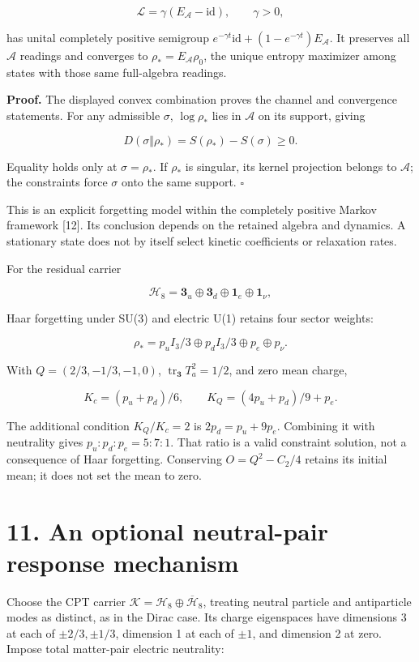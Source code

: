 \documentclass[
  11pt,
  a4paper,
]{article}
\begin{document}
\[
 \mathcal L=\gamma(E_{\mathcal A}-\mathrm{id}),\qquad\gamma>0,
\]

has unital completely positive semigroup \(e^{-\gamma t}\mathrm{id}+(1-e^{-\gamma t})E_{\mathcal A}\). It preserves all \(\mathcal A\) readings and converges to \(\rho_*=E_{\mathcal A}\rho_0\), the unique entropy maximizer among states with those same full-algebra readings.

\textbf{Proof.} The displayed convex combination proves the channel and convergence statements. For any admissible \(\sigma\), \(\log\rho_*\) lies in \(\mathcal A\) on its support, giving

\[
 D(\sigma\Vert\rho_*)=S(\rho_*)-S(\sigma)\ge0.
\]

Equality holds only at \(\sigma=\rho_*\). If \(\rho_*\) is singular, its kernel projection belongs to \(\mathcal A\); the constraints force \(\sigma\) onto the same support. \(\square\)

This is an explicit forgetting model within the completely positive Markov framework {[}12{]}. Its conclusion depends on the retained algebra and dynamics. A stationary state does not by itself select kinetic coefficients or relaxation rates.

For the residual carrier

\[
 \mathcal H_8=\mathbf3_u\oplus\mathbf3_d\oplus\mathbf1_e\oplus\mathbf1_\nu,
\]

Haar forgetting under SU(3) and electric U(1) retains four sector weights:

\[
 \rho_*=p_uI_3/3\oplus p_dI_3/3\oplus p_e\oplus p_\nu.
\]

With \(Q=(2/3,-1/3,-1,0)\), \(\operatorname{tr}_{\mathbf3}T_a^2=1/2\), and zero mean charge,

\[
 K_c=(p_u+p_d)/6,\qquad K_Q=(4p_u+p_d)/9+p_e. \tag{9}
\]

The additional condition \(K_Q/K_c=2\) is \(2p_d=p_u+9p_e\). Combining it with neutrality gives \(p_u:p_d:p_e=5:7:1\). That ratio is a valid constraint solution, not a consequence of Haar forgetting. Conserving \(O=Q^2-C_2/4\) retains its initial mean; it does not set the mean to zero.

\section{11. An optional neutral-pair response mechanism}\label{an-optional-neutral-pair-response-mechanism}

Choose the CPT carrier \(\mathcal K=\mathcal H_8\oplus\overline{\mathcal H}_8\), treating neutral particle and antiparticle modes as distinct, as in the Dirac case. Its charge eigenspaces have dimensions 3 at each of \(\pm2/3,\pm1/3\), dimension 1 at each of \(\pm1\), and dimension 2 at zero. Impose total matter-pair electric neutrality:
\end{document}
